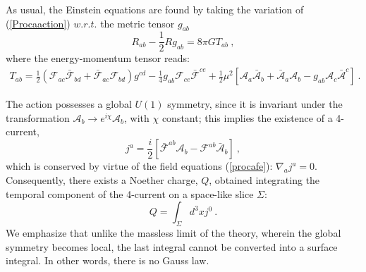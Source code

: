 As usual, the Einstein equations are found by taking the variation of
(\ref{Procaaction}) $w.r.t.$ the metric tensor $g_{ab}$
\begin{equation}
R_{ab}-\frac{1}{2}R g_{ab}=8 \pi G T_{ab} \ ,
\label{Einstein-eqs}
\end{equation}
where the energy-momentum tensor reads:
\begin{eqnarray}
T_{ab}=\frac{1}{2}
( \mathcal{F}_{ac}\bar{\mathcal{F}}_{bd}
+\bar{\mathcal{F}}_{ac} \mathcal{F}_{bd}
)g^{cd}
-\frac{1}{4}g_{ab}\mathcal{F}_{ce}\bar{\mathcal{F}}^{ce}+\frac{1}{2}\mu^2\left[  
\mathcal{A}_{a}\bar{\mathcal{A}}_{b}
+\bar{\mathcal{A}}_{a}\mathcal{A}_{b}
-g_{ab} \mathcal{A}_c\bar{\mathcal{A}}^c\right]\ . \ \ \ \ \ \ \  \ 
\label{procaemt}
\end{eqnarray}

The action possesses a global $U(1)$ symmetry, since it is invariant under the transformation 
$\mathcal{A}_b\rightarrow e^{i\chi}\mathcal{A}_b$, with $\chi$ constant; 
this implies the existence of a  4-current, 
%
\begin{equation}
\label{j}
j^a=\frac{i}{2}\left[\bar{\mathcal{F}}^{ab}\mathcal{A}_b-\mathcal{F}^{ab}\bar{\mathcal{A}}_b\right] \ ,
\end{equation}
which is conserved by virtue of the field equations (\ref{procafe}): $\nabla_a j^a=0$. Consequently, there exists a Noether charge, $Q$, obtained integrating the temporal component of the 4-current on a space-like slice $\Sigma$:
\begin{equation}
Q=\int_\Sigma d^3x j^0 \ .
\label{Pq}
\end{equation}
We emphasize that unlike the massless limit of the theory, wherein the global symmetry becomes local, the last integral cannot be converted into a surface integral. In other words, there is no Gauss law.


 
